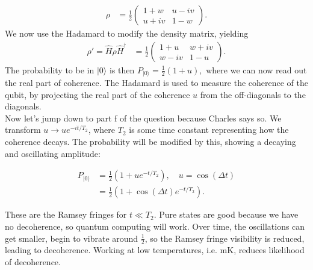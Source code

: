 \documentclass[a4paper, 11pt, normalem]{report}
\begin{document}
\begin{example}
\begin{align}
        \rho &=  \frac12\begin{pmatrix} 1+w & u-iv \\ u+iv & 1-w\end{pmatrix}.
    \end{align}
    We now use the Hadamard to modify the density matrix, yielding
    \begin{align}
        \rho'= \hat{H}\rho\hat{H}^\dagger &= \frac12\begin{pmatrix} 1+u & w+iv \\ w-iv & 1-u\end{pmatrix}.
    \end{align}
    The probability to be in $|0\rangle$ is then $P_{|0\rangle} = \frac12(1+u),$ where we can now read out the real part of coherence.
    The Hadamard is used to measure the coherence of the qubit, by projecting the real part of the coherence $u$ from the off-diagonals to the diagonals.\\
    Now let's jump down to part f of the question because Charles says so.
    We transform $u\to ue^{-it/T_2}$, where $T_2$ is some time constant representing how the coherence decays.
    The probability will be modified by this, showing a decaying and oscillating amplitude:
    \begin{figure}[H]
        \begin{multicols}{2}
        \centering
        \columnbreak
        \vfill
        \begin{align}
            P_{|0\rangle} &= \frac12(1+ue^{-t/T_2}),\quad u=\cos(\Delta t) \\
                          &= \frac12(1+\cos(\Delta t)e^{-t/T_2}).
        \end{align}
        \vfill
        \end{multicols}
    \end{figure}
    These are the Ramsey fringes for $t\ll T_2$.
    Pure states are good because we have no decoherence, so quantum computing will work.
    Over time, the oscillations can get smaller, begin to vibrate around $\frac12$, so the Ramsey fringe visibility is reduced, leading to decoherence.
    Working at low temperatures, i.e. mK, reduces likelihood of decoherence.
\end{example}
\end{document}
